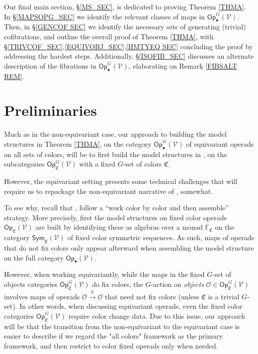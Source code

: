 \documentclass[a4paper,10pt
,draft
]{article}%
\numberwithin{equation}{section}
\numberwithin{figure}{section}
\theoremstyle{definition} %
\newcommand{\V}{\ensuremath{\mathcal V}}
\renewcommand{\O}{\ensuremath{\mathcal O}}
\newcommand{\1}{\ensuremath{\mathbbm 1}}%
\begin{document}
Our final main section, \S \ref{MS_SEC}, is dedicated to proving 
Theorem \ref{THMA}.
In \S \ref{MAPSOPG_SEC} we identify the relevant classes of maps
in $\mathsf{Op}^G_{\bullet}(\V)$.
Then, in \S \ref{GENCOF SEC} we identify
the necessary sets of generating (trivial) cofibrations,
and outline the overall proof of Theorem \ref{THMA},
with \S \ref{TRIVCOF_SEC},\ref{EQUIVOBJ_SEC},\ref{HMTYEQ SEC}
concluding the proof by addressing the hardest steps.
Additionally, \S \ref{ISOFIB_SEC} discusses an alternate description
of the fibrations in
$\mathsf{Op}^G_{\bullet}(\V)$,
elaborating on 
Remark \ref{FIBSALT REM}.







\section{Preliminaries}\label{PRE SEC}


Much as in the non-equivariant case, 
our approach to building the model structures
in Theorem \ref{THMA},
on the category $\mathsf{Op}^G_{\bullet}(\V)$
of equivariant operads on all sets of colors,
will be to first build the model structures in 
\cite[Thm. \ref{OC-THMI}]{BP_FCOP},
on the subcategories $\mathsf{Op}^G_{\mathfrak{C}}(\V)$
with a fixed $G$-set of colors $\mathfrak{C}$.

However, the equivariant setting presents some technical challenges that will require us to repackage the non-equivariant narrative of
\cite{CM13b},\cite{Cav} somewhat.

To see why, recall that \cite{CM13b},\cite{Cav}
follow a ``work color by color and then assemble'' strategy.
More precisely, first the model structures on fixed color operads 
$\mathsf{Op}_{\mathfrak{C}}(\V)$
are built by identifying these as algebras over a monad
$\mathbb{F}_{\mathfrak{C}}$
on the category $\mathsf{Sym}_{\mathfrak{C}}(\V)$
of fixed color symmetric sequences.
As such, maps of operads that do not fix colors
only appear afterward when assembling the model structure on the full category $\mathsf{Op}_{\bullet}(\V)$.

However, when working equivariantly, 
while the maps in the fixed $G$-set of objects categories 
$\mathsf{Op}^G_{\mathfrak{C}}(\V)$ do fix colors, 
the $G$-action on \emph{objects}
$\O \in \mathsf{Op}^G_{\mathfrak{C}}(\V)$
involves maps of operads $\O \xrightarrow{g} \O$
that need not fix colors (unless $\mathfrak{C}$ is a trivial $G$-set).
In other words, when discussing equivariant operads,
even the fixed color categories 
$\mathsf{Op}^G_{\mathfrak{C}}(\V)$
require color change data.
Due to this issue, 
our approach will be that the transition from the non-equivariant to the equivariant case is easier to describe 
if we regard the "all colors" framework as the primary framework,
and then restrict to color fixed operads only when needed.
\end{document}
